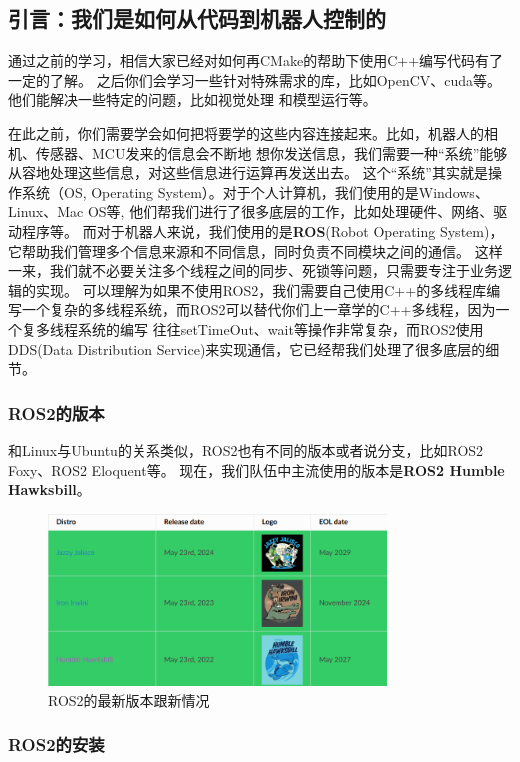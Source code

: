 \subsection{\textbf{引言：我们是如何从代码到机器人控制的}}
通过之前的学习，相信大家已经对如何再CMake的帮助下使用C++编写代码有了一定的了解。
之后你们会学习一些针对特殊需求的库，比如OpenCV、cuda等。他们能解决一些特定的问题，比如视觉处理
和模型运行等。

在此之前，你们需要学会如何把将要学的这些内容连接起来。比如，机器人的相机、传感器、MCU发来的信息会不断地
想你发送信息，我们需要一种“系统”能够从容地处理这些信息，对这些信息进行运算再发送出去。
这个“系统”其实就是操作系统（OS, Operating System）。对于个人计算机，我们使用的是Windows、Linux、Mac OS等,
他们帮我们进行了很多底层的工作，比如处理硬件、网络、驱动程序等。
而对于机器人来说，我们使用的是\textbf{ROS}(Robot Operating System)，它帮助我们管理多个信息来源和不同信息，同时负责不同模块之间的通信。
这样一来，我们就不必要关注多个线程之间的同步、死锁等问题，只需要专注于业务逻辑的实现。
可以理解为如果不使用ROS2，我们需要自己使用C++的多线程库编写一个复杂的多线程系统，而ROS2可以替代你们上一章学的C++多线程，因为一个复多线程系统的编写
往往setTimeOut、wait等操作非常复杂，而ROS2使用DDS(Data Distribution Service)来实现通信，它已经帮我们处理了很多底层的细节。
\subsubsection{ROS2的版本}
和Linux与Ubuntu的关系类似，ROS2也有不同的版本或者说分支，比如ROS2 Foxy、ROS2 Eloquent等。
现在，我们队伍中主流使用的版本是\textbf{ROS2 Humble Hawksbill}。
\begin{figure}
    \centering
    \includegraphics[width=0.8\textwidth]{Chapter4/img/ros2_logo.png}
    \caption{ROS2的最新版本跟新情况}
    \label{fig:ros2_logo}
\end{figure}

\subsubsection{ROS2的安装}

